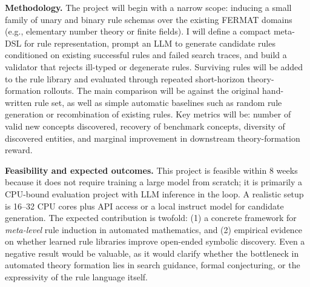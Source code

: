 \documentclass[10pt]{article}
\begin{document}
\textbf{Methodology.}
The project will begin with a narrow scope: inducing a small family of unary and binary rule schemas over the existing FERMAT domains (e.g., elementary number theory or finite fields). I will define a compact meta-DSL for rule representation, prompt an LLM to generate candidate rules conditioned on existing successful rules and failed search traces, and build a validator that rejects ill-typed or degenerate rules. Surviving rules will be added to the rule library and evaluated through repeated short-horizon theory-formation rollouts. The main comparison will be against the original hand-written rule set, as well as simple automatic baselines such as random rule generation or recombination of existing rules. Key metrics will be: number of valid new concepts discovered, recovery of benchmark concepts, diversity of discovered entities, and marginal improvement in downstream theory-formation reward.

\textbf{Feasibility and expected outcomes.}
This project is feasible within 8 weeks because it does not require training a large model from scratch; it is primarily a CPU-bound evaluation project with LLM inference in the loop. A realistic setup is 16--32 CPU cores plus API access or a local instruct model for candidate generation. The expected contribution is twofold: (1) a concrete framework for \emph{meta-level} rule induction in automated mathematics, and (2) empirical evidence on whether learned rule libraries improve open-ended symbolic discovery. Even a negative result would be valuable, as it would clarify whether the bottleneck in automated theory formation lies in search guidance, formal conjecturing, or the expressivity of the rule language itself.
\end{document}
